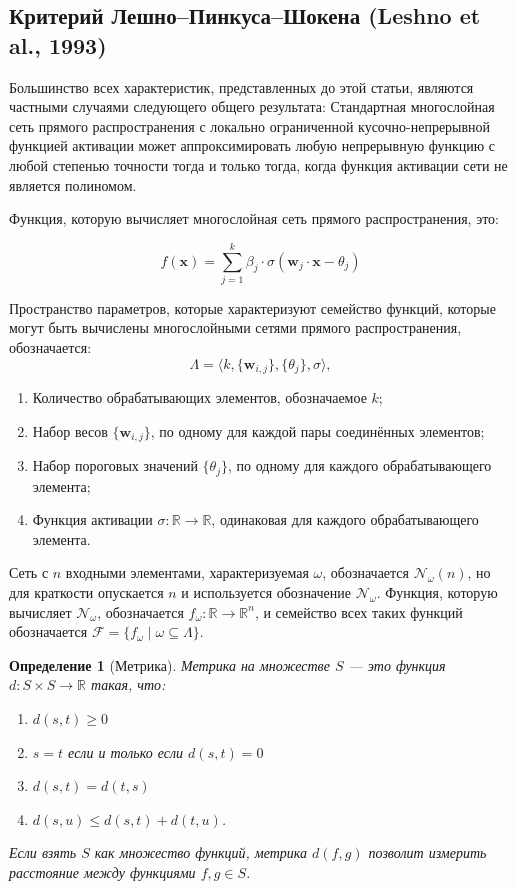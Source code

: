 \documentclass[12pt]{article}
\newtheorem{definition}{Определение}
\begin{document}
	\subsection{Критерий Лешно–Пинкуса–Шокена (Leshno et al., 1993)}
	
	Большинство всех характеристик, представленных до этой статьи, являются частными случаями следующего общего результата: Стандартная многослойная сеть прямого распространения с локально ограниченной кусочно-непрерывной функцией активации может аппроксимировать любую непрерывную функцию с любой степенью точности тогда и только тогда, когда функция активации сети не является полиномом.
	
	Функция, которую вычисляет многослойная сеть прямого распространения, это:
	
	\begin{equation}
		f(\mathbf{x}) = \sum_{j=1}^{k} \beta_j \cdot \sigma(\mathbf{w}_j \cdot \mathbf{x} - \theta_j) \tag{1}
	\end{equation}
	
	Пространство параметров, которые характеризуют семейство функций, которые могут быть вычислены многослойными сетями прямого распространения, обозначается:
	\[
	\Lambda = \langle k, \{\mathbf{w}_{i,j}\}, \{\theta_j\}, \sigma \rangle,
	\]
	
	\begin{enumerate}
		\item Количество обрабатывающих элементов, обозначаемое $k$;
		\item Набор весов $\{\mathbf{w}_{i,j}\}$, по одному для каждой пары соединённых элементов;
		\item Набор пороговых значений $\{\theta_j\}$, по одному для каждого обрабатывающего элемента;
		\item Функция активации $\sigma: \mathbb{R} \to \mathbb{R}$, одинаковая для каждого обрабатывающего элемента.
	\end{enumerate}
	Сеть с $n$ входными элементами, характеризуемая $\omega$, обозначается $\mathcal{N}_\omega(n)$, но для краткости опускается $n$ и используется обозначение $\mathcal{N}_\omega$. Функция, которую вычисляет $\mathcal{N}_\omega$, обозначается $f_\omega: \mathbb{R} \to \mathbb{R}^n$, и семейство всех таких функций обозначается $\mathcal{F} = \{ f_\omega \mid \omega \subseteq \Lambda \}$.\begin{definition}[Метрика]
		Метрика на множестве $S$ — это функция $d: S \times S \to \mathbb{R}$ такая, что:
		
		\begin{enumerate}
			\item $d(s, t) \geq 0$
			\item $s = t$ если и только если $d(s, t) = 0$
			\item $d(s, t) = d(t, s)$
			\item $d(s, u) \leq d(s, t) + d(t, u)$.
		\end{enumerate}
		
		Если взять $S$ как множество функций, метрика $d(f, g)$ позволит измерить расстояние между функциями $f, g \in S$.
	\end{definition}
	
\end{document}
